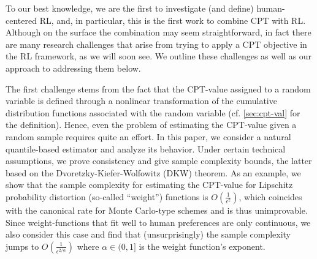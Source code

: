 To our best knowledge, we are the first to investigate (and define) human-centered RL, and, in particular, 
this is the first work to combine CPT with RL. Although on the surface the combination may seem straightforward, in fact there are many research challenges that arise from trying to apply a CPT objective in the RL framework, as we will soon see. 
We outline these challenges as well as our approach to addressing them below. 

The first challenge stems from the fact that the CPT-value assigned to a random variable is defined through a nonlinear transformation of the cumulative distribution functions associated with the random variable (cf. \cref{sec:cpt-val} for the definition). 
Hence, even the problem of estimating the CPT-value given a random sample requires quite an effort.
In this paper, we consider a natural quantile-based estimator and analyze its behavior.
Under certain technical assumptions, we prove consistency and give sample complexity bounds, the latter based on the
 Dvoretzky-Kiefer-Wolfowitz (DKW) theorem.
As an example, we show that the sample complexity for estimating the CPT-value 
for Lipschitz probability distortion (so-called ``weight'') functions is  $O\left(\frac1{\epsilon^2}\right)$, which coincides with the canonical rate for Monte Carlo-type schemes and is thus unimprovable. Since weight-functions that fit well to human preferences are only  \holder continuous, we also consider this case and find that (unsurprisingly) the sample complexity  jumps to $O\left(\frac1{\epsilon^{2/\alpha}}\right)$ where $\alpha\in (0,1]$ is the weight function's \holder exponent.

